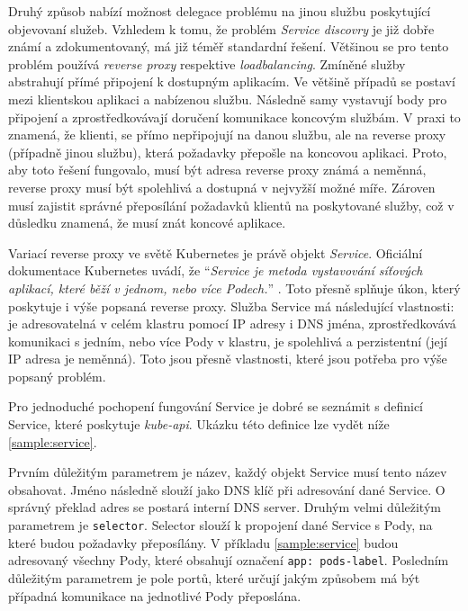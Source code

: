 Druhý způsob nabízí možnost delegace problému na jinou službu poskytující objevovaní služeb. Vzhledem k tomu, že problém \textit{Service discovry} je již dobře známí a zdokumentovaný, má již téměř standardní řešení. Většinou se pro tento problém  používá \textit{reverse proxy} respektive \textit{loadbalancing}. Zmíněné služby abstrahují přímé připojení k dostupným aplikacím. Ve většině případů se postaví mezi klientskou aplikaci a nabízenou službu. Následně samy vystavují body pro připojení a zprostředkovávají doručení komunikace koncovým službám. V praxi to znamená, že klienti, se přímo nepřipojují na danou službu, ale na reverse proxy (případně jinou službu), která požadavky přepošle na koncovou aplikaci. Proto, aby toto řešení fungovalo, musí být adresa reverse proxy známá a neměnná, reverse proxy musí být spolehlivá a dostupná v nejvyžší možné míře. Zároven musí zajistit správné přeposílání požadavků klientů na poskytované služby, což v důsledku znamená, že musí znát koncové aplikace.

Variací reverse proxy ve světě Kubernetes je právě objekt \textit{Service}. Oficiální dokumentace Kubernetes uvádí, že \enquote{\textit{Service je metoda vystavování síťových aplikací, které běží v jednom, nebo více Podech.}} \cite{thekubernetesauthors_2023_service}. Toto přesně splňuje úkon, který poskytuje i výše popsaná reverse proxy. Služba Service má následující vlastnosti: je adresovatelná v celém klastru pomocí IP adresy i DNS jména, zprostředkovává komunikaci s jedním, nebo více Pody v klastru, je spolehlivá a perzistentní (její IP adresa je neměnná). Toto jsou přesně vlastnosti, které jsou potřeba pro výše popsaný problém.

Pro jednoduché pochopení fungování Service je dobré se seznámit s definicí Service, které poskytuje \textit{kube-api}. Ukázku této definice lze vydět níže \ref{sample:service}.


Prvním důležitým parametrem je název, každý objekt Service musí tento název obsahovat. Jméno následně slouží jako DNS klíč při adresování dané Service. O správný překlad adres se postará interní DNS server. Druhým velmi důležitým parametrem je \verb|selector|. Selector slouží k propojení dané Service s Pody, na které budou požadavky přeposílány. V příkladu \ref{sample:service} budou adresovaný všechny Pody, které obsahují označení \verb|app: pods-label|. Posledním důležitým parametrem je pole portů, které určují jakým způsobem má být případná komunikace na jednotlivé Pody přeposlána.

